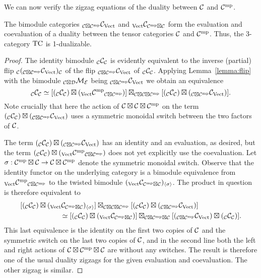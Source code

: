 \documentclass{amsart}
\begin{document}
We can now verify the zigzag equations of the duality between $\mathcal C$ and $\mathcal C^{\mathrm{mp}}$.
\begin{proposition} \label{prop:onedual}
The bimodule categories ${}_{\mathcal C \boxtimes \mathcal C^{\mathrm{mp}}} \mathcal C_{\mathrm{Vect}}$ and ${}_{\mathrm{Vect}} \mathcal C_{\mathcal C^{\mathrm{mp}} \boxtimes \mathcal C}$ form the evaluation and coevaluation of a duality between the tensor categories $\mathcal C$ and $\mathcal C^{\mathrm{mp}}$.  Thus, the 3-category $\mathrm{TC}$ is 1-dualizable.
\end{proposition}
\begin{proof}
The identity bimodule ${}_\mathcal C \mathcal C_\mathcal C$ is evidently equivalent to the inverse (partial) flip ${}_\mathcal C ({}_{\mathcal C \boxtimes \mathcal C^{\mathrm{mp}}} \mathcal C_{\mathrm{Vect}})_\mathcal C$ of the flip ${}_{\mathcal C \boxtimes \mathcal C^{\mathrm{mp}}} \mathcal C_{\mathrm{Vect}}$ of ${}_\mathcal C \mathcal C_\mathcal C$.  Applying Lemma~\ref{lemma:flip} with the bimodule ${}_{\mathcal C \boxtimes \mathcal D} \mathcal M_\mathcal E$ being ${}_{\mathcal C \boxtimes \mathcal C^{\mathrm{mp}}} \mathcal C_{\mathrm{Vect}}$ we obtain an equivalence
\[
{}_\mathcal C \mathcal C_\mathcal C
\simeq
[({}_\mathcal C \mathcal C_\mathcal C) \boxtimes ({}_{\mathrm{Vect}} {\mathcal C^{\mathrm{mp}}}_{\mathcal C \boxtimes \mathcal C^{\mathrm{mp}}})] \boxtimes_{\mathcal C \boxtimes \mathcal C \boxtimes \mathcal C^{\mathrm{mp}}} [({}_\mathcal C \mathcal C_\mathcal C) \boxtimes ({}_{\mathcal C \boxtimes \mathcal C^{\mathrm{mp}}} \mathcal C_{\mathrm{Vect}})].
\]
Note crucially that here the action of $\mathcal C \boxtimes \mathcal C \boxtimes \mathcal C^{\mathrm{mp}}$ on the term $({}_\mathcal C \mathcal C_\mathcal C) \boxtimes ({}_{\mathcal C \boxtimes \mathcal C^{\mathrm{mp}}} \mathcal C_{\mathrm{Vect}})$ uses a symmetric monoidal switch between the two factors of $\mathcal C$.  

The term $({}_\mathcal C \mathcal C_\mathcal C) \boxtimes ({}_{\mathcal C \boxtimes \mathcal C^{\mathrm{mp}}} \mathcal C_{\mathrm{Vect}})$ has an identity and an evaluation, as desired, but the term $({}_\mathcal C \mathcal C_\mathcal C) \boxtimes ({}_{\mathrm{Vect}} {\mathcal C^{\mathrm{mp}}}_{\mathcal C \boxtimes \mathcal C^{\mathrm{mp}}})$ does not yet explicitly use the coevaluation.  Let $\sigma: \mathcal C^{\mathrm{mp}} \boxtimes \mathcal C \rightarrow \mathcal C \boxtimes \mathcal C^{\mathrm{mp}}$ denote the symmetric monoidal switch.  Observe that the identity functor on the underlying category is a bimodule equivalence from  ${}_{\mathrm{Vect}} {\mathcal C^{\mathrm{mp}}}_{\mathcal C \boxtimes \mathcal C^{\mathrm{mp}}}$ to the twisted bimodule $({}_{\mathrm{Vect}} \mathcal C_{\mathcal C^{\mathrm{mp}} \boxtimes \mathcal C})_{\langle \sigma \rangle}$.  The product in question is therefore equivalent to
\begin{align*}
&[({}_\mathcal C \mathcal C_\mathcal C) \boxtimes ({}_{\mathrm{Vect}} {\mathcal C}_{\mathcal C^{\mathrm{mp}} \boxtimes \mathcal C})_{\langle \sigma \rangle}] \boxtimes_{\mathcal C \boxtimes \mathcal C \boxtimes \mathcal C^{\mathrm{mp}}} [({}_\mathcal C \mathcal C_\mathcal C) \boxtimes ({}_{\mathcal C \boxtimes \mathcal C^{\mathrm{mp}}} \mathcal C_{\mathrm{Vect}})] \\
& \hspace{2cm} \simeq
[({}_\mathcal C \mathcal C_\mathcal C) \boxtimes ({}_{\mathrm{Vect}} {\mathcal C}_{\mathcal C^{\mathrm{mp}} \boxtimes \mathcal C})] \boxtimes_{\mathcal C \boxtimes \mathcal C^{\mathrm{mp}} \boxtimes \mathcal C} [({}_{\mathcal C \boxtimes \mathcal C^{\mathrm{mp}}} \mathcal C_{\mathrm{Vect}}) \boxtimes ({}_\mathcal C \mathcal C_\mathcal C)].
\end{align*}
This last equivalence is the identity on the first two copies of $\mathcal C$ and the symmetric switch on the last two copies of $\mathcal C$, and in the second line both the left and right actions of $\mathcal C \boxtimes \mathcal C^{\mathrm{mp}} \boxtimes \mathcal C$ are without any switches.  The result is therefore one of the usual duality zigzags for the given evaluation and coevaluation.  The other zigzag is similar.
\end{proof}
\end{document}
